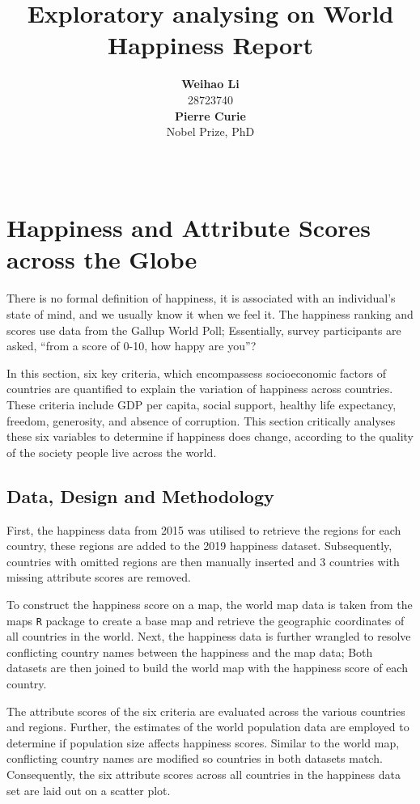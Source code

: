 \documentclass[11pt,a4paper,]{article}
\title{Exploratory analysing on World Happiness Report}
\author{\sf\Large\textbf{ Weihao Li}\\ {\sf\large 28723740\\[0.5cm]} \sf\Large\textbf{ Pierre Curie}\\ {\sf\large Nobel Prize, PhD\\[0.5cm]}}
\date{\sf\Date~\Month~\Year}
\makeatletter
\def\titlepage{\front{\expandafter{\@title}}{\@author}{\@organization}}
\makeatother
\begin{document}
\titlepage

\hypertarget{happiness-and-attribute-scores-across-the-globe}{%
\section{Happiness and Attribute Scores across the Globe}\label{happiness-and-attribute-scores-across-the-globe}}

There is no formal definition of happiness, it is associated with an individual's state of mind, and we usually know it when we feel it. The happiness ranking and scores use data from the Gallup World Poll; Essentially, survey participants are asked, ``from a score of 0-10, how happy are you''? \autocite{sachs2018world}

In this section, six key criteria, which encompassess socioeconomic factors of countries are quantified to explain the variation of happiness across countries. These criteria include GDP per capita, social support, healthy life expectancy, freedom, generosity, and absence of corruption. This section critically analyses these six variables to determine if happiness does change, according to the quality of the society people live across the world.

\clearpage

\hypertarget{data-design-and-methodology}{%
\subsection{Data, Design and Methodology}\label{data-design-and-methodology}}

First, the happiness data from 2015 was utilised to retrieve the regions for each country, these regions are added to the 2019 happiness dataset. Subsequently, countries with omitted regions are then manually inserted and 3 countries with missing attribute scores are removed.

To construct the happiness score on a map, the world map data is taken from the maps \texttt{R} package \autocite{maps} to create a base map and retrieve the geographic coordinates of all countries in the world. Next, the happiness data is further wrangled to resolve conflicting country names between the happiness and the map data; Both datasets are then joined to build the world map with the happiness score of each country.

The attribute scores of the six criteria are evaluated across the various countries and regions. Further, the estimates of the world population data are employed \autocite{wbstats} to determine if population size affects happiness scores. Similar to the world map, conflicting country names are modified so countries in both datasets match. Consequently, the six attribute scores across all countries in the happiness data set are laid out on a scatter plot.
\end{document}
